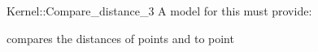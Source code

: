 \begin{ccRefFunctionObjectConcept}{Kernel::Compare_distance_3}
A model for this must provide:


      {compares the distances of points  and  to point }

\end{ccRefFunctionObjectConcept}
